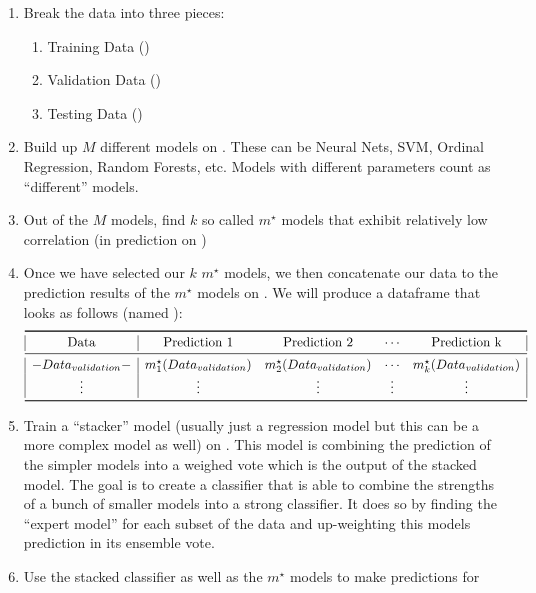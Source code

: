 \documentclass[10pt,a4paper, hidelinks]{article} %
\begin{document}
\begin{enumerate}
	\item Break the data into three pieces: 
	\begin{enumerate}
		\item Training Data (\dattrain) 
		\item Validation Data (\datval)
		\item Testing Data (\dattest)
	\end{enumerate}
	\item Build up $M$ different models on \dattrain. These can be Neural Nets, SVM, Ordinal Regression, Random Forests, etc. Models with different parameters count as ``different'' models.
	\item Out of the $M$ models, find $k$ so called $m^{\star}$ models that exhibit relatively low correlation (in prediction on \dattrain)
	\item Once we have selected our $k$ $m^{\star}$ models, we then concatenate our data to the prediction results of the $m^{\star}$ models on \datval. We will produce a dataframe that looks as follows (named \datvaltest):
	\begin{align*}
	\begin{array}{|c|cccc|}
		\toprule
		\text{Data} & \text{Prediction 1} & \text{Prediction 2} & \cdots & \text{Prediction k} \\ 
		\midrule
		- \datval - & m_1^{\star}(\datval) & m_2^{\star}(\datval) & \cdots & m_k^{\star}(\datval) \\ 
		\vdots & \vdots & \vdots & \vdots & \vdots\\
		\bottomrule
	\end{array} 
	\end{align*}
	\item Train a ``stacker'' model (usually just a regression model but this can be a more complex model as well) on \datvaltest . This model is combining the prediction of the simpler models into a weighed vote which is the output of the stacked model. The goal is to create a classifier that is able to combine the strengths of a bunch of smaller models into a strong classifier. It does so by finding the ``expert model'' for each subset of the data and up-weighting this models prediction in its ensemble vote.
	\item Use the stacked classifier as well as the $m^{\star}$ models to make predictions for \dattest
\end{enumerate} 
\end{document}
